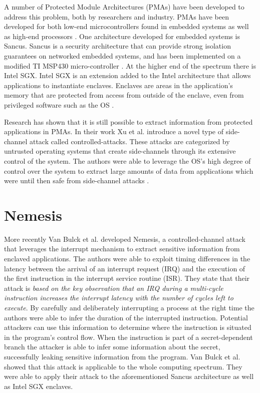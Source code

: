 A number of Protected Module Architectures (PMAs) have been developed to address this problem, both by researchers and industry. 
PMAs have been developed for both low-end microcontrollers found in embedded systems \cite{trustlite, smart} as well as high-end processors \cite{isox}.
One architecture developed for embedded systems is Sancus. Sancus is a security architecture that can provide strong isolation guarantees on networked embedded systems, 
and has been implemented on a modified TI MSP430 micro-controller \cite{sancus}. 
At the higher end of the spectrum there is Intel SGX. 
Intel SGX is an extension  added to the Intel architecture that allows applications to instantiate enclaves. 
Enclaves are areas in the application's memory that are protected from access from outside of the enclave, even from 
privileged software such as the OS \cite{SGX}. 

Research has shown that it is still possible to extract information from protected applications in PMAs. In their work Xu et al. \cite{xu} introduce a novel type of side-channel attack 
called controlled-attacks. These attacks are categorized by untrusted operating systems that create side-channels through its extensive control of the system.
The authors were able to leverage the OS's high degree of control over the system to extract large amounts of data from applications which were until 
then safe from side-channel attacks . 

\section{Nemesis}
More recently Van Bulck et al. \cite{Nemesis} developed Nemesis, a controlled-channel attack that leverages the interrupt mechanism to extract sensitive information from 
enclaved applications. The authors were able to exploit timing differences in the latency between the arrival of an interrupt request (IRQ) and the execution of the first instruction in the 
interrupt service routine (ISR). They state that their attack is \textit{based on the key observation that an IRQ during a multi-cycle instruction increases the interrupt 
latency with the number of cycles left to execute}. By carefully and deliberately interrupting a process at the right time the authors were able to infer the duration of the interrupted instruction. 
Potential attackers can use this information to determine where the instruction is situated in the program's control flow. When the instruction is part of a secret-dependent branch the 
attacker is able to infer some information about the secret, successfully leaking sensitive information from the program. Van Bulck et al. \cite{Nemesis} showed that this attack is applicable to 
the whole computing spectrum. They were able to apply their attack to the aforementioned Sancus architecture as well as Intel SGX enclaves.  

